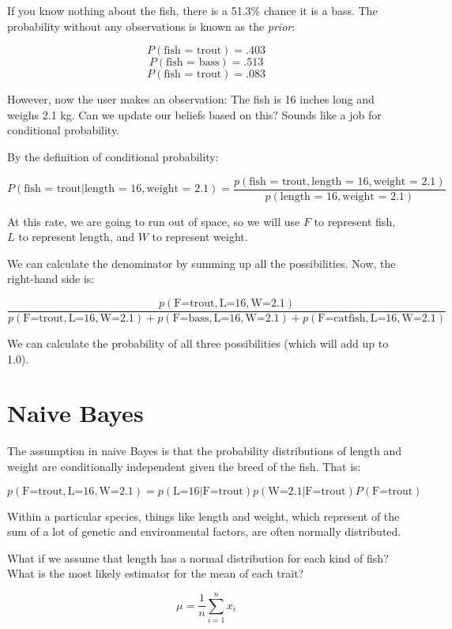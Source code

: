 If you know nothing about the fish,  there is a 51.3\% chance it is a bass.   The probability without any observations is known as the \textit{prior}:

$$P(\text{fish = trout}) = .403$$
$$P(\text{fish = bass}) = .513$$
$$P(\text{fish = trout}) = .083$$

However, now the user makes an observation: The fish is 16 inches long and weighs 2.1 kg.  Can we update our beliefs based on this? Sounds like a job for conditional probability.

By the definition of conditional probability:

$$P(\text{fish = trout} | \text{length = 16}, \text{weight = 2.1}) = \frac{p(\text{fish = trout} , \text{length = 16}, \text{weight = 2.1}) }{p( \text{length = 16}, \text{weight = 2.1}) }$$

At this rate, we are going to run out of space,  so we will use $F$ to represent fish, $L$ to represent length, and $W$ to represent weight.

We can calculate the denominator by summing up all the possibilities. Now, the right-hand side is:

$$\frac{p(\text{F=trout} , \text{L=16}, \text{W=2.1}) }{p(\text{F=trout} , \text{L=16}, \text{W=2.1})  + p(\text{F=bass} , \text{L=16}, \text{W=2.1})  + p(\text{F=catfish} , \text{L=16}, \text{W=2.1})  }$$

We can calculate the probability of all three possibilities (which will add up to 1.0).

\section{Naive Bayes}

The assumption in naive Bayes is that the probability distributions of length and weight are conditionally independent given the breed of the fish.   That is:

$$p(\text{F=trout} , \text{L=16}, \text{W=2.1}) = p( \text{L=16} | \text{F=trout})  p( \text{W=2.1} | \text{F=trout})P(\text{F=trout})$$

Within a particular species, things like length and weight, which represent of the sum of a lot of genetic and environmental factors,  are often normally distributed.

What if we assume that length has a normal distribution for each kind of fish?  What is the most likely estimator for the mean of each trait?  

$$\mu = \frac{1}{n} \sum_{i=1}^{n} x_i$$

